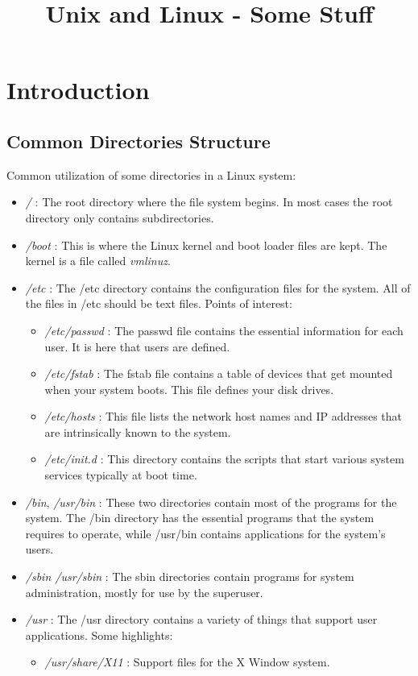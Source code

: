 \documentclass[10pt,letterpaper]{book}
\begin{document}
\title{Unix and Linux - Some Stuff}
\tableofcontents
\chapter{Introduction}
\section{Common Directories Structure}
Common utilization of some directories in a Linux system:
\begin{itemize}
\item \textit{/} : The root directory where the file system begins. In most cases the root directory only contains subdirectories.
\item \textit{/boot} : This is where the Linux kernel and boot loader files are kept. The kernel is a file called \textit{vmlinuz}.
\item \textit{/etc} : The /etc directory contains the configuration files for the system. All of the files in /etc should be text files. Points of interest:
\begin{itemize}
\item \textit{/etc/passwd} :  The passwd file contains the essential information for each user. It is here that users are defined.
\item \textit{/etc/fstab} : The fstab file contains a table of devices that get mounted when your system boots. This file defines your disk drives.
\item \textit{/etc/hosts} : This file lists the network host names and IP addresses that are intrinsically known to the system.
\item \textit{/etc/init.d} : This directory contains the scripts that start various system services typically at boot time.
\end{itemize}
\item \textit{/bin}, \textit{/usr/bin} : These two directories contain most of the programs for the system. The /bin directory has the essential programs that the system requires to operate, while /usr/bin contains applications for the system's users.
\item \textit{/sbin /usr/sbin} : The sbin directories contain programs for system administration, mostly for use by the superuser.
\item \textit{/usr} : The /usr directory contains a variety of things that support user applications. Some highlights:
\begin{itemize}
\item \textit{/usr/share/X11} : Support files for the X Window system.

\end{itemize}
\end{itemize}
\end{document}

